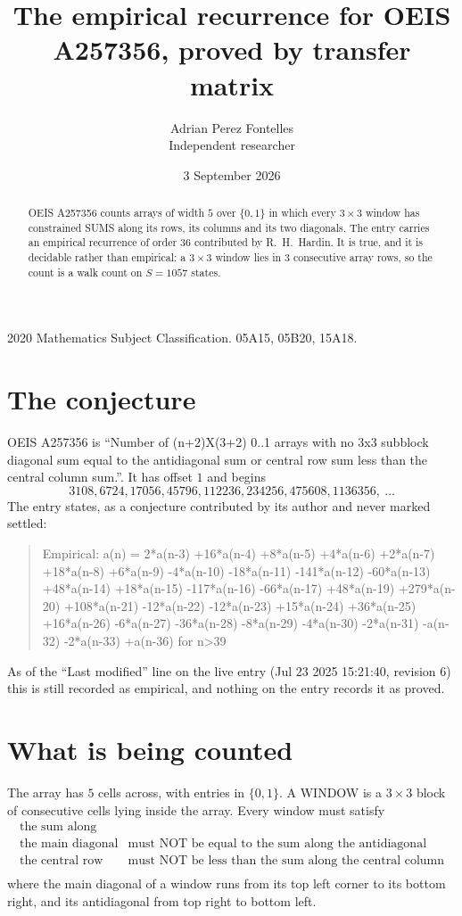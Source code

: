 \documentclass[11pt,a4paper]{article}
\title{The empirical recurrence for OEIS A257356, proved by transfer matrix}
\author{Adrian Perez Fontelles\\ \small Independent researcher}
\date{3 September 2026}
\theoremstyle{plain}
\theoremstyle{definition}
\begin{document}
\maketitle

\begin{abstract}
OEIS A257356 counts arrays of width $5$ over $\{0,1\}$ in which every $3\times3$ window has
constrained SUMS along its rows, its columns and its two diagonals. The entry carries an
empirical recurrence of order $36$ contributed by R.~H.~Hardin. It is true, and it is
decidable rather than empirical: a $3\times3$ window lies in $3$ consecutive array rows,
so the count is a walk count on $S=1057$ states.
\end{abstract}

\noindent\small 2020 Mathematics Subject Classification. 05A15, 05B20, 15A18.\normalsize

\section{The conjecture}

OEIS A257356 is ``Number of (n+2)X(3+2) 0..1 arrays with no 3x3 subblock diagonal sum equal to the antidiagonal sum or central row sum less than the central column sum.''. It has offset $1$ and begins
\[
3108, 6724, 17056, 45796, 112236, 234256, 475608, 1136356,\ \dots
\]
The entry states, as a conjecture contributed by its author and never marked settled:
\begin{quote}
Empirical: a(n) = 2*a(n-3) +16*a(n-4) +8*a(n-5) +4*a(n-6) +2*a(n-7) +18*a(n-8) +6*a(n-9) -4*a(n-10) -18*a(n-11) -141*a(n-12) -60*a(n-13) +48*a(n-14) +18*a(n-15) -117*a(n-16) -66*a(n-17) +48*a(n-19) +279*a(n-20) +108*a(n-21) -12*a(n-22) -12*a(n-23) +15*a(n-24) +36*a(n-25) +16*a(n-26) -6*a(n-27) -36*a(n-28) -8*a(n-29) -4*a(n-30) -2*a(n-31) -a(n-32) -2*a(n-33) +a(n-36) for n>39
\end{quote}
As of the ``Last modified'' line on the live entry (Jul 23 2025 15:21:40, revision 6) this is still
recorded as empirical, and nothing on the entry records it as proved.

\section{What is being counted}

The array has $5$ cells across, with entries in $\{0,1\}$. A WINDOW is a $3\times3$ block
of consecutive cells lying inside the array. Every window must satisfy
\[
\begin{array}{ll}
\text{the sum along} & \text{} \\[2pt]
\text{the main diagonal} & \text{must NOT be equal to the sum along the antidiagonal} \\
\text{the central row} & \text{must NOT be less than the sum along the central column} \\
\end{array}
\]
where the main diagonal of a window runs from its top left corner to its bottom right, and its
antidiagonal from top right to bottom left.
\end{document}
